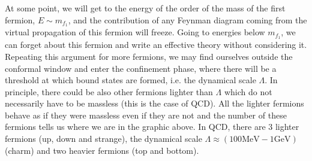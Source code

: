 \documentclass[../main.tex]{subfiles}
\begin{document}
At some point, we will get to the energy of the order of the mass of the first fermion, $E\sim m_{f_1}$, and the contribution of any Feynman diagram coming from the virtual propagation of this fermion will freeze. Going to energies below $m_{f_1}$, we can forget about this fermion and write an effective theory without considering it. Repeating this argument for more fermions, we may find ourselves outside the conformal window and enter the confinement phase, where there will be a threshold at which bound states are formed, i.e. the dynamical scale $\Lambda$. In principle, there could be also other fermions lighter than $\Lambda$ which do not necessarily have to be massless (this is the case of QCD). All the lighter fermions behave as if they were massless even if they are not and the number of these fermions tells us where we are in the graphic above. In QCD, there are 3 lighter fermions (up, down and strange), the dynamical scale $\Lambda\approx(100\text{MeV}-1\text{GeV})$ (charm) and two heavier fermions (top and bottom).
\end{document}
